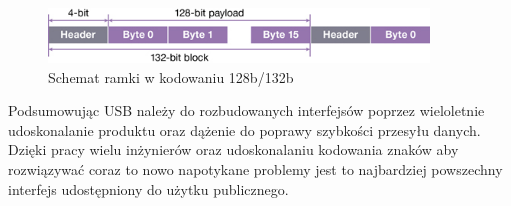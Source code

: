 \documentclass{BscUS}
\begin{document}
\begin{figure}[H]
\centering
\includegraphics[width=0.9\textwidth]{./img/128to132coding}
\caption{Schemat ramki w kodowaniu 128b/132b \cite{128to132coding}}
\label{fig:128to132coding}
\end{figure}
\indent Podsumowując USB należy do rozbudowanych interfejsów poprzez wieloletnie udoskonalanie produktu oraz dążenie do poprawy szybkości przesyłu danych. Dzięki pracy wielu inżynierów oraz udoskonalaniu kodowania znaków aby rozwiązywać coraz to nowo napotykane problemy jest to najbardziej powszechny interfejs udostępniony do użytku publicznego.
\end{document}
